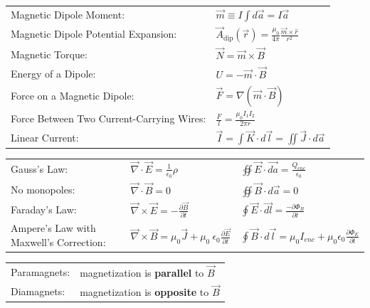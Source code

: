 \documentclass{article}
\newcommand{\ds}{\displaystyle}
\newcommand{\formbox}[2]{\begin{center} \begin{tcolorbox}[colback=white, title = #1, boxrule=2pt,arc=3.4pt,boxsep=0mm] #2\end{tcolorbox}\end{center}}
\begin{document}
\begin{multicols*}{2}
{{\begin{tabular}[t]{ m{13em} m{25em}  }
            Magnetic Dipole Moment: & $ \displaystyle  \vec{m} \equiv I \int d\vec{a} = I \vec{a}$\\
            Magnetic Dipole Potential Expansion: & $\displaystyle \vec{A}_\textrm{dip}(\vec{r}) = \frac{\mu_0}{4\pi} \frac{\vec{m} \times \hat{r}}{r^2}$\\
            Magnetic Torque: & $\displaystyle \vec{N} = \vec{m} \times \vec{B}$\\
            Energy of a Dipole: & $\ds U = -\vec{m} \cdot \vec{B}$\\
            Force on a Magnetic Dipole: & $\displaystyle \vec{F} = \nabla(\vec{m} \cdot \vec{B})$\\
            Force Between Two Current-Carrying Wires: & $\displaystyle \frac{F}{l} = \frac{\mu_0 I_1 I_2}{2\pi r}$\\
            Linear Current: & $\ds \vec{I} = \int \vec{K} \cdot d \vec{l} = \iint \vec{J}\cdot d\vec{a}$
        \end{tabular}}
    }
    \formbox{Maxwell's Equations}{
        {\renewcommand{\arraystretch}{1.75}%
        \begin{tabular}{ m{7em} m{10em} m{12em}  }
            Gauss's Law: & $\displaystyle \vec{\nabla} \cdot \vec{E} = \frac{1}{\epsilon_0}\rho$ & $\displaystyle\oiint \vec{E}\cdot\vec{da} = \frac{Q_{enc}}{\epsilon_0}$\\
            No monopoles: & $\displaystyle \vec{\nabla} \cdot \vec{B} = 0$ & $\displaystyle \oiint\vec{B}\cdot d\vec{a}=0$\\
            Faraday's Law: & $\displaystyle \vec{\nabla} \times \vec{E} = -\frac{\partial \vec{B}}{\partial t}$ & $\displaystyle\oint\vec{E}\cdot\vec{dl} = \frac{-\partial \Phi_{B}}{\partial t}$\\
            \small{Ampere's Law with Maxwell's Correction:} & \small{$\displaystyle \vec{\nabla} \times \vec{B} = \mu_0 \vec{J} + \mu_0\ \epsilon_0 \frac{\partial \vec{E}}{\partial t}$} & \small{$\displaystyle \oint\vec{B}\cdot d\vec{l}=\mu_0I_{enc}+\mu_0\epsilon_0\frac{\partial \Phi_E}{\partial t}$}\\
        \end{tabular}}
    }
    \formbox{Magnetostatics in Matter}{
        {\renewcommand{\arraystretch}{1.75}%
        \begin{tabular}{ m{12em} m{20em}  }
            Paramagnets: & magnetization is \textbf{parallel} to $\vec{B}$\\
            Diamagnets: & magnetization is \textbf{opposite} to $\vec{B}$\\

\end{tabular}}}
\end{multicols*}
\end{document}
